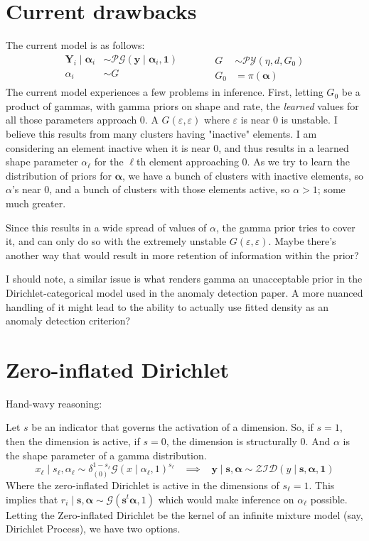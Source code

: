 \documentclass{article}
\begin{document}
\section*{Current drawbacks}
The current model is as follows:
\[
\begin{aligned}
\bm{Y}_i\mid\bm{\alpha}_i &\sim \mathcal{PG}(\bm{y}\mid\bm{\alpha}_i, \bm{1})\\
\alpha_i &\sim G\\
\end{aligned}
\;\hspace{1cm}\;
\begin{aligned}
G &\sim \mathcal{PY}(\eta, d, G_0)\\
G_0 &= \pi(\bm{\alpha})
\end{aligned}
\]
The current model experiences a few problems in inference.  First, letting $G_0$ be a product of gammas, with gamma priors on shape and rate, the \emph{learned} values for all those parameters approach 0.  A $G(\varepsilon,\varepsilon)$ where $\varepsilon$ is near 0 is unstable.  I believe this results from many clusters having "inactive" elements.  I am considering an element inactive when it is near 0, and thus results in a learned shape parameter $\alpha_{\ell}$ for the $\ell$th element approaching 0.  As we try to learn the distribution of priors for $\bm{\alpha}$, we have a bunch of clusters with inactive elements, so $\alpha$'s near 0, and a bunch of clusters with those elements active, so $\alpha > 1$; some much greater.

Since this results in a wide spread of values of $\alpha$, the gamma prior tries to cover it, and can only do so with the extremely unstable $G(\varepsilon,\varepsilon)$.  Maybe there's another way that would result in more retention of information within the prior?

I should note, a similar issue is what renders gamma an unacceptable prior in the Dirichlet-categorical model used in the anomaly detection paper.  A more nuanced handling of it might lead to the ability to actually use fitted density as an anomaly detection criterion?


\section*{Zero-inflated Dirichlet}
Hand-wavy reasoning:

Let $s$ be an indicator that governs the activation of a dimension.  So, if $s = 1$, then the dimension is active, if $s = 0$, the dimension is structurally 0.  And $\alpha$ is the shape parameter of a gamma distribution.
\[
    x_{\ell} \mid s_{\ell}, \alpha_{\ell} \sim \delta_{(0)}^{1-s_{\ell}}\mathcal{G}(x\mid\alpha_{\ell},1)^{s_{\ell}}\;\;\;\implies\;\;\;
    \bm{y} \mid \bm{s}, \bm{\alpha} \sim \mathcal{ZID}(y \mid \bm{s}, \bm{\alpha}, \bm{1})
\]
Where the zero-inflated Dirichlet is active in the dimensions of $s_{\ell} = 1$. This implies that $r_i\mid \bm{s},\bm{\alpha} \sim \mathcal{G}(\bm{s}^t\bm{\alpha}, 1)$ which would make inference on $\alpha_{\ell}$ possible.  Letting the Zero-inflated Dirichlet be the kernel of an infinite mixture model (say, Dirichlet Process), we have two options.
\end{document}
